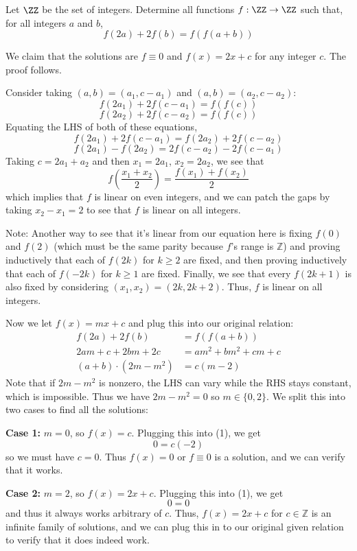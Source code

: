 
\begin{problem}[ISL 2019 A1]
    Let $\ZZ$ be the set of integers. Determine all functions $f: \ZZ \rightarrow \ZZ$ such that, for all integers $a$ and $b$, \[f(2a)+2f(b)=f(f(a+b))\]
\end{problem}

\begin{solution}
    We claim that the solutions are $f \equiv 0$ and $f(x) = 2x+c$ for any integer $c$. The proof follows.
    
    Consider taking $(a, b) = (a_1, c-a_1)$ and $(a, b) = (a_2, c-a_2)$:
    \[f(2a_1) + 2f(c-a_1) = f(f(c))\]
    \[f(2a_2) + 2f(c-a_2) = f(f(c))\]
    Equating the LHS of both of these equations,
    \[f(2a_1) + 2f(c-a_1) = f(2a_2) + 2f(c-a_2)\]
    \[f(2a_1) - f(2a_2) = 2f(c-a_2) - 2f(c-a_1)\]
    Taking $c = 2a_1+a_2$ and then $x_1 = 2a_1$, $x_2 = 2a_2$, we see that
    \[f\!\left(\frac{x_1+x_2}{2}\right) = \frac{f(x_1) + f(x_2)}{2}\]
    which implies that $f$ is linear on even integers, and we can patch the gaps by taking $x_2-x_1 = 2$ to see that $f$ is linear on all integers.
    
    Note: Another way to see that it's linear from our equation here is fixing $f(0)$ and $f(2)$ (which must be the same parity because $f$'s range is $\mathbb{Z}$) and proving inductively that each of $f(2k)$ for $k \geq 2$ are fixed, and then proving inductively that each of $f(-2k)$ for $k \geq 1$ are fixed. Finally, we see that every $f(2k+1)$ is also fixed by considering $(x_1, x_2) = (2k, 2k+2)$. Thus, $f$ is linear on all integers.
    
    Now we let $f(x) = mx+c$ and plug this into our original relation:
    \begin{align}
    f(2a) + 2f(b) &= f(f(a+b))\nonumber\\
    2am + c + 2bm + 2c &= am^2 + bm^2 + cm + c\nonumber\\
    (a+b) \cdot (2m-m^2) &= c(m-2) \tag{1}
    \end{align}
    Note that if $2m-m^2$ is nonzero, the LHS can vary while the RHS stays constant, which is impossible. Thus we have $2m-m^2=0$ so $m \in \{0,2\}$. We split this into two cases to find all the solutions:
    
    \textbf{Case 1: } $m = 0$, so $f(x) = c$. Plugging this into (1), we get
    \[0 = c(-2)\]
    so we must have $c=0$. Thus $f(x) = 0$ or $f \equiv 0$ is a solution, and we can verify that it works.
    
    \textbf{Case 2: } $m = 2$, so $f(x) = 2x+c$. Plugging this into (1), we get
    \[0 = 0\]
    and thus it always works arbitrary of $c$. Thus, $f(x) = 2x+c$ for $c \in \mathbb{Z}$ is an infinite family of solutions, and we can plug this in to our original given relation to verify that it does indeed work.
\end{solution}
